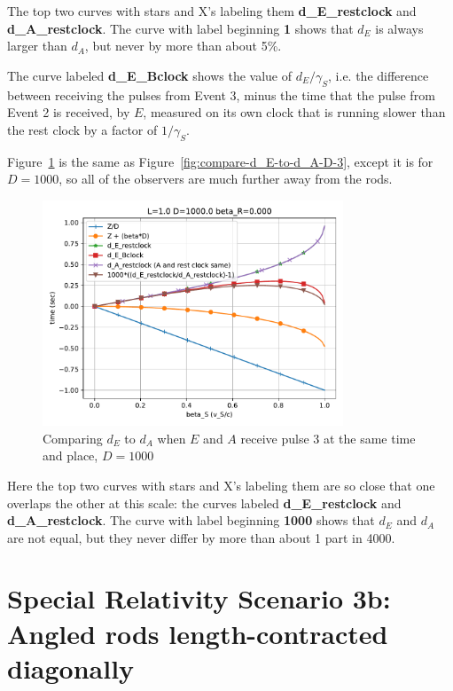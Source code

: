 \documentclass[a4paper]{article}
\theoremstyle{plain}
\theoremstyle{definition}
\begin{document}
The top two curves with stars and X's labeling them
\textbf{d\_E\_restclock} and \textbf{d\_A\_restclock}.  The curve with
label beginning \textbf{1} shows that $d_E$ is always larger than
$d_A$, but never by more than about 5\%.

The curve labeled \textbf{d\_E\_Bclock} shows the value of
$d_E / \gamma_S$, i.e. the difference between receiving the pulses
from Event 3, minus the time that the pulse from Event 2 is received,
by $E$, measured on its own clock that is running slower than the rest
clock by a factor of $1/\gamma_S$.

Figure~\ref{fig:compare-d_E-to-d_A-D-1000} is the same as
Figure~\ref{fig:compare-d_E-to-d_A-D-3}, except it is for $D=1000$, so
all of the observers are much further away from the rods.
\begin{figure}[h!]
	\centering
	\includegraphics[width=0.8\textwidth]{scen2b-where-E-starts-to-receive-pulse-3-at-A-location-D-1000.0-beta_R-0.000.pdf}
	\caption{Comparing $d_E$ to $d_A$ when $E$ and $A$ receive pulse 3 at the same time and place, $D=1000$}
	\label{fig:compare-d_E-to-d_A-D-1000}
\end{figure}
Here the top two curves with stars and X's labeling them are so close
that one overlaps the other at this scale: the curves labeled
\textbf{d\_E\_restclock} and \textbf{d\_A\_restclock}.
The curve with label beginning \textbf{1000} shows that $d_E$ and
$d_A$ are not equal, but they never differ by more than about 1 part
in 4000.


\section{Special Relativity Scenario 3b: Angled rods length-contracted diagonally}
\label{sec:scen3b}
\end{document}
